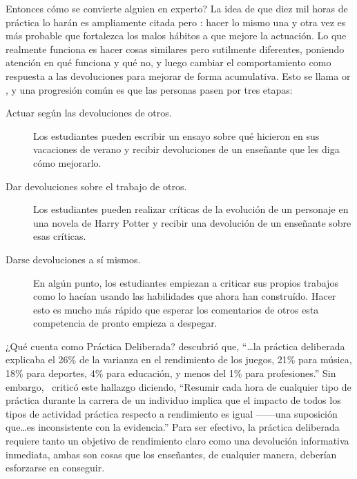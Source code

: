 
Entonces cómo se convierte alguien en experto?
La idea de que diez mil horas de práctica lo harán es ampliamente citada
pero :
hacer lo mismo una y otra vez es más probable que fortalezca los malos hábitos a que mejore la actuación.
Lo que realmente funciona es hacer cosas similares pero sutilmente diferentes,
poniendo atención en qué funciona y qué no,
y luego cambiar el comportamiento como respuesta a las devoluciones para mejorar de forma acumulativa.
Esto se llama 
or ,
y una progresión común es que las personas pasen por tres etapas:

\begin{description}

\item[Actuar según las devoluciones de otros.]
  Los estudiantes pueden escribir un ensayo sobre qué hicieron en sus vacaciones de verano
  y recibir devoluciones de un enseñante que les diga cómo mejorarlo.

\item[Dar devoluciones sobre el trabajo de otros.]
  Los estudiantes pueden realizar críticas de la evolución de un personaje en una novela de  Harry Potter
  y recibir una devolución de un enseñante sobre esas críticas.

\item[Darse devoluciones a sí mismos.]
  En algún punto,
  los estudiantes empiezan a criticar sus propios trabajos como lo hacían 
  usando las habilidades que ahora han construído.
  Hacer esto es mucho más rápido que esperar los comentarios de otros 
  esta competencia de pronto empieza a despegar.

\end{description}

\begin{aside}{¿Qué cuenta como Práctica Deliberada?}
  \cite{Macn2014} descubrió que,
  ``{\ldots}la práctica deliberada explicaba el 26\% de la varianza en el rendimiento de los juegos,
  21\% para música,
  18\% para deportes,
  4\% para educación,
  y menos del 1\% para profesiones.''
  Sin embargo,~\cite{Eric2016} criticó este hallazgo diciendo,
  ``Resumir cada hora de cualquier tipo de práctica durante la carrera de un individuo
 implica que el impacto de todos los tipos de actividad práctica respecto a  rendimiento es igual ------una suposición
  que{\ldots}es inconsistente con la evidencia.''
  Para ser efectivo,
  la práctica deliberada requiere tanto un objetivo de rendimiento claro
  como una devolución informativa inmediata,
  ambas son cosas que los enseñantes, de cualquier manera, deberían esforzarse en conseguir.
\end{aside}

